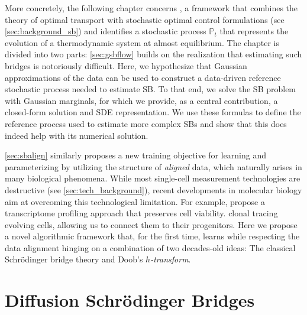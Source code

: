 More concretely, the following chapter concerns , a framework that combines the theory of optimal transport with stochastic optimal control formulations (see \cref{sec:background_sb}) and identifies a stochastic process $\mathbb{P}_t$ that represents the evolution of a thermodynamic system at almost equilibrium. 
The chapter is divided into two parts: 
\cref{sec:gsbflow} builds on the realization that estimating such bridges is notoriously difficult. Here, we hypothesize that Gaussian approximations of the data can be used to construct a data-driven reference stochastic process needed to estimate SB. To that end, we solve the \acrshort{SB} problem with Gaussian marginals, for which we provide, as a central contribution, a closed-form solution and SDE representation. We use these formulas to define the reference process used to estimate more complex SBs and show that this does indeed help with its numerical solution.

\cref{sec:sbalign} similarly proposes a new training objective for learning and parameterizing  by utilizing the structure of \emph{aligned} data, which naturally arises in many biological phenomena.
While most single-cell measurement technologies are destructive (see \cref{sec:tech_background}), recent developments in molecular biology aim at overcoming this technological limitation. For example, \citet{chen2022live} propose a transcriptome profiling approach that preserves cell viability. \citet{weinreb2020lineage} clonal tracing evolving cells, allowing us to connect them to their progenitors.
Here we propose a novel algorithmic framework that, for the first time, learns  while respecting the data alignment hinging on a combination of two decades-old ideas: The classical Schr{\"o}dinger bridge theory and Doob's \emph{$h$-transform}.

\section{Diffusion Schr{\"o}dinger Bridges}
\label{sec:background_dsb}

